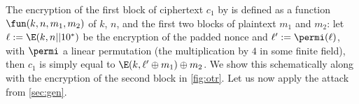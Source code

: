 The encryption of the first block of ciphertext $c_1$ by \proestotr is defined as a function
$\fun(k, n, m_1, m_2)$
of $k$, $n$, and the first two blocks of plaintext $m_1$ and $m_2$:
let $\ell := \E(k, n || 10^*)$ be the encryption of the padded nonce and
$\ell' := \permi(\ell)$, with $\permi$ a linear permutation (the multiplication by $4$ in some finite field),
then $c_1$ is simply equal to $\E(k, \ell' \oplus m_1) \oplus m_2$. We show this schematically along with the encryption
of the second block in \autoref{fig:otr}.
Let us now apply the attack from \autoref{sec:gen}.

\begin{figure}[ht]
\begin{center}
\end{center}
\end{figure}
